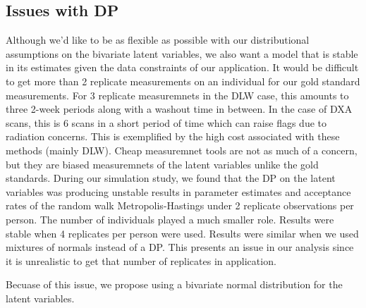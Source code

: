 \documentclass[11pt]{article}\usepackage[]{graphicx}\usepackage[]{color}
\begin{document}
\subsection{Issues with DP}

Although we'd like to be as flexible as possible with our distributional assumptions on the bivariate latent variables, we also want a model that is stable in its estimates given the data constraints of our application. It would be difficult to get more than 2 replicate measurements on an individual for our gold standard measurements. For 3 replicate measuremnets in the DLW case, this amounts to three 2-week periods along with a washout time in between. In the case of DXA scans, this is 6 scans in a short period of time which can raise flags due to radiation concerns. This is exemplified by the high cost associated with these methods (mainly DLW). Cheap measuremnet tools are not as much of a concern, but they are biased measuremnets of the latent variables unlike the gold standards. During our simulation study, we found that the DP on the latent variables was producing unstable results in parameter estimates and acceptance rates of the random walk Metropolis-Hastings under 2 replicate observations per person. The number of individuals played a much smaller role. Results were stable when 4 replicates per person were used. Results were similar when we used mixtures of normals instead of a DP. This presents an issue in our analysis since it is unrealistic to get that number of replicates in application. 

Becuase of this issue, we propose using a bivariate normal distribution for the latent variables. 
\end{document}
